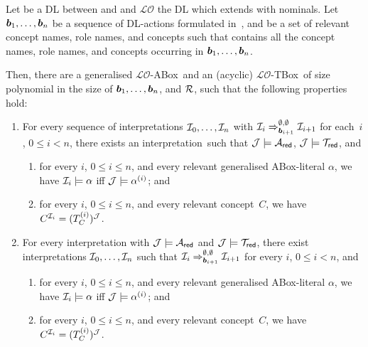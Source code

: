 \begin{lemma}\label{lem:ared-tred}
    Let \Lmc be a DL between \ALC and \ALCQIO and $\mathcal{LO}$ the DL which
    extends \Lmc with nominals.  Let $\boldsymbol b_1,\dots,\boldsymbol b_n$ be a sequence of
    DL-actions formulated in~\Lmc, and \Rmc be a set of relevant concept names,
    role names, and concepts such that \Rmc contains all the concept names, role
    names, and concepts occurring in $\boldsymbol b_1,\dots,\boldsymbol b_n$.

    Then, there are a generalised $\mathcal{LO}$-ABox~\Ared and an (acyclic)
    $\mathcal{LO}$-TBox~\Tred of size polynomial in the size of
    $\boldsymbol b_1,\dots,\boldsymbol b_n$, and $\mathcal{R}$, such that the following properties hold:
    \begin{enumerate}
        \item\label{enum:reduction-direction-one}
            For every sequence of interpretations $\mathcal{I}_0,\dots,\mathcal{I}_n$ with
            $\mathcal{I}_i\Rightarrow_{\boldsymbol b_{i+1}}^{\emptyset,\emptyset}\mathcal{I}_{i+1}$ for
            each~$i$, $0\le i<n$, there exists an interpretation~\Jmc such that
            $\mathcal{J}\models\mathcal{A}_\mathsf{red}$, $\mathcal{J}\models\mathcal{T}_\mathsf{red}$, and
            \begin{enumerate}
                \item\label{enum:reduction-direction-one-a}
                    for every $i$, $0\le i\le n$, and every relevant generalised
                    ABox-literal $\alpha$, we have $\mathcal{I}_i\models\alpha$ iff
                    $\mathcal{J}\models\alpha^{(i)}$; and
                \item\label{enum:reduction-direction-one-b}
                    for every $i$, $0\le i\le n$, and every relevant
                    concept~$C$, we have $C^{\mathcal{I}_i}=(T_C^{(i)})^\mathcal{J}$.
            \end{enumerate}
        \item\label{enum:reduction-direction-two}
            For every interpretation \Jmc with $\mathcal{J}\models\mathcal{A}_\mathsf{red}$ and
            $\mathcal{J}\models\mathcal{T}_\mathsf{red}$, there exist interpretations
            $\mathcal{I}_0,\dots,\mathcal{I}_n$ such that
            $\mathcal{I}_i\Rightarrow_{\boldsymbol b_{i+1}}^{\emptyset,\emptyset}\mathcal{I}_{i+1}$
            for every $i$, $0\le i<n$, and
            \begin{enumerate}
                \item\label{enum:reduction-direction-two-a}
                    for every $i$, $0\le i\le n$, and every relevant generalised
                    ABox-literal $\alpha$, we have $\mathcal{I}_i\models\alpha$ iff
                    $\mathcal{J}\models\alpha^{(i)}$; and
                \item\label{enum:reduction-direction-two-b}
                    for every $i$, $0\le i\le n$, and every relevant
                    concept~$C$, we have $C^{\mathcal{I}_i}=(T_C^{(i)})^\mathcal{J}$.
            \end{enumerate}
    \end{enumerate}
\end{lemma}

